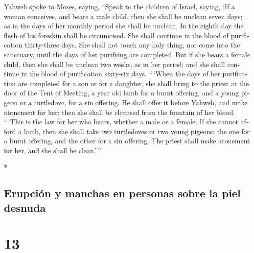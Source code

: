 \begin{paracol}{2}
\begin{otherlanguage}{english}
 Yahweh spoke to Moses, saying,  ``Speak to
the children of Israel, saying, `If a woman conceives, and bears a male
child, then she shall be unclean seven days; as in the days of her
monthly period she shall be unclean.  In the eighth day
the flesh of his foreskin shall be circumcised.  She shall
continue in the blood of purification thirty-three days. She shall not
touch any holy thing, nor come into the sanctuary, until the days of her
purifying are completed.  But if she bears a female child,
then she shall be unclean two weeks, as in her period; and she shall
continue in the blood of purification sixty-six days. 
``\,`When the days of her purification are completed for a son or for a
daughter, she shall bring to the priest at the door of the Tent of
Meeting, a year old lamb for a burnt offering, and a young pigeon or a
turtledove, for a sin offering.  He shall offer it before
Yahweh, and make atonement for her; then she shall be cleansed from the
fountain of her blood. ``\,`This is the law for her who bears, whether a
male or a female.  If she cannot afford a lamb, then she
shall take two turtledoves or two young pigeons: the one for a burnt
offering, and the other for a sin offering. The priest shall make
atonement for her, and she shall be clean.'\,''

\end{otherlanguage}

\switchcolumn[0]*

\hypertarget{erupciuxf3n-y-manchas-en-personas-sobre-la-piel-desnuda}{%
\subsection{Erupción y manchas en personas sobre la piel
desnuda}\label{erupciuxf3n-y-manchas-en-personas-sobre-la-piel-desnuda}}

\hypertarget{section-24}{%
\section{13}\label{section-24}}


\end{paracol}
